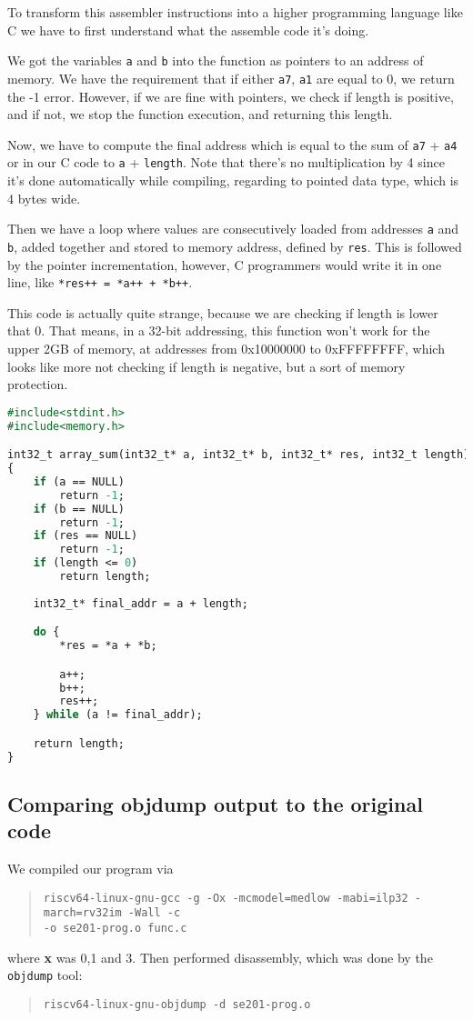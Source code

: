 \documentclass[a4paper]{article}
\begin{document}
To transform this assembler instructions into a higher programming language like C we have to first understand what the assemble code it's doing. 

We got the variables \texttt{a} and \texttt{b} into the function as pointers to an address of memory. We have the requirement that if either \texttt{a7}, \texttt{a1} are equal to 0, we return the -1 error. However, if we are fine with pointers, we check if length is positive, and if not, we stop the function execution, and returning this length.

Now, we have to compute the final address which is equal to the sum of \texttt{a7} + \texttt{a4} or in our C code to \texttt{a} + \texttt{length}. Note that there's no multiplication by 4 since it's done automatically while compiling, regarding to pointed data type, which is 4 bytes wide.

Then we have a loop where values are consecutively loaded from addresses \texttt{a} and \texttt{b}, added together and stored to memory address, defined by \texttt{res}. This is followed by the pointer incrementation, however, C programmers would write it in one line, like \texttt{*res++ = *a++ + *b++}.

This code is actually quite strange, because we are checking if length is lower that 0. That means, in a 32-bit addressing, this function won't work for the upper 2GB of memory, at addresses from 0x10000000 to 0xFFFFFFFF, which looks like more not checking if length is negative, but a sort of memory protection. 

\begin{lstlisting}[language=Caml, caption=C code]
#include<stdint.h>
#include<memory.h>

int32_t array_sum(int32_t* a, int32_t* b, int32_t* res, int32_t length)
{
    if (a == NULL)
        return -1;
    if (b == NULL)
        return -1;
    if (res == NULL)
        return -1;
    if (length <= 0)
        return length;
    
    int32_t* final_addr = a + length;

    do {
        *res = *a + *b;

        a++;
        b++;
        res++;
    } while (a != final_addr);

    return length;
}

\end{lstlisting}

\subsection{Comparing objdump output to the original code}
We compiled our program via
\begin{quote}
    \texttt{riscv64-linux-gnu-gcc -g -Ox -mcmodel=medlow -mabi=ilp32
-march=rv32im -Wall -c\\ -o se201-prog.o func.c}
\end{quote}
where \textbf{x} was 0,1 and 3. Then performed disassembly, which was done by the \texttt{objdump} tool:
\begin{quote}
    \texttt{riscv64-linux-gnu-objdump -d se201-prog.o}
\end{quote}
\end{document}
